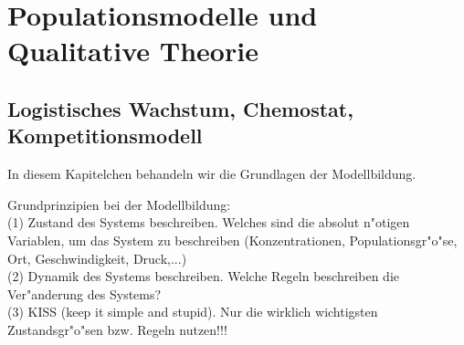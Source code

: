  




\section{Populationsmodelle und Qualitative Theorie}
\subsection{Logistisches Wachstum, Chemostat, Kompetitionsmodell}
In diesem Kapitelchen behandeln wir die Grundlagen der Modellbildung. 

\begin{sbem} Grundprinzipien bei der Modellbildung:\\
{\rm (1) Zustand des Systems beschreiben.} Welches sind die absolut n"otigen 
Variablen, um das System zu beschreiben (Konzentrationen, Populationsgr"o"se, 
Ort, Geschwindigkeit, Druck,...)\\
{\rm (2) Dynamik des Systems beschreiben.} Welche Regeln beschreiben die 
Ver"anderung des Systems?\\
{\rm (3)  KISS} (keep it simple and stupid). Nur die wirklich wichtigsten 
Zustandsgr"o"sen bzw. Regeln nutzen!!!
\end{sbem}

